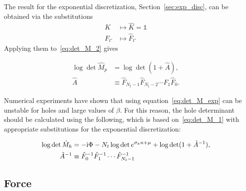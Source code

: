 \documentclass[a4paper, fleqn, twoside, notitlepage]{scrartcl}
\begin{document}
\noindent
The result for the exponential discretization, Section~\ref{sec:exp_disc}, can be obtained via the substitutions
\begin{align}
  K &\mapsto \hat{K} = \mathds{1}\label{eq:exp_subs_K}\\
  F_{t'} &\mapsto \hat{F}_{t'}\label{eq:exp_subs_F}
\end{align}
Applying them to~\eqref{eq:det_M_2} gives
\begin{resultbox}
  \vspace{-\baselineskip}
  \begin{align}
    \log \det \hat{M}_p &= \log \det (1 + \hat{A}),\label{eq:det_M_exp}\\
    \hat{A} &\equiv \hat{F}_{N_t-1} \hat{F}_{N_t-2} \cdots \hat{F}_{1} \hat{F}_{0}.\label{eq:def_B}
  \end{align}
\end{resultbox}

\noindent
Numerical experiments have shown that using equation~\eqref{eq:det_M_exp} can be unstable for holes and large values of $\beta$.
For this reason, the hole determinant should be calculated using the following, which is based on~\eqref{eq:det_M_1} with appropriate substitutions for the exponential discretization:
\begin{resultbox}
  \vspace{-\baselineskip}
  \begin{align}
    \log \det \hat{M}_h &= -\mathrm{i} \Phi  - N_t \log \det e^{\sigma_{\tilde{\kappa}}\kappa+\mu} + \log \det (1 + \hat{A}^{-1}),\label{eq:det_M_exp_h}\\
    \hat{A}^{-1} &\equiv \hat{F}_0^{-1} \hat{F}_1^{-1} \cdots \hat{F}_{N_t-1}^{-1}
  \end{align}
\end{resultbox}


\subsection{Force}
\end{document}

